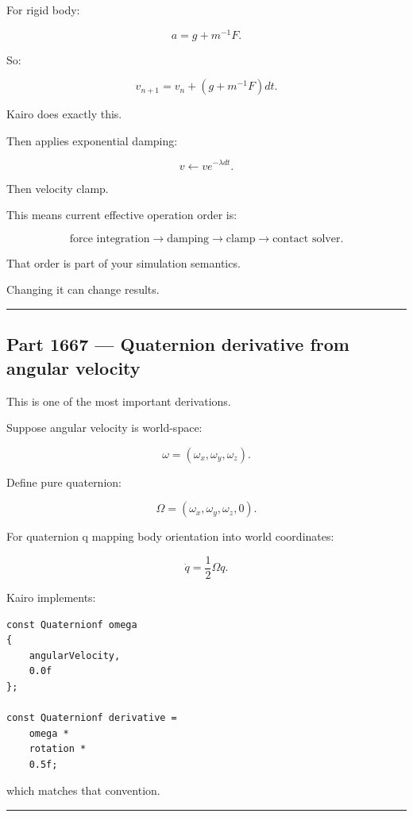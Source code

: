 For rigid body:

\[
a
=
g
+
m^{-1}F.
\]

So:

\[
\boxed{
v_{n+1}
=
v_n+
\left(
g+m^{-1}F
\right)dt.
}
\]

Kairo does exactly this.

Then applies exponential damping:

\[
v
\leftarrow
ve^{-\lambda dt}.
\]

Then velocity clamp.

This means current effective operation order is:

\[
\text{force integration}
\rightarrow
\text{damping}
\rightarrow
\text{clamp}
\rightarrow
\text{contact solver}.
\]

That order is part of your simulation semantics.

Changing it can change results.

\begin{center}\rule{0.5\linewidth}{0.5pt}\end{center}

\subsection{Part 1667 --- Quaternion derivative from angular velocity}\label{06-engine-ii-ch037-part-1667-quaternion-derivative-from-angular-velocity}

This is one of the most important derivations.

Suppose angular velocity is world-space:

\[
\omega=
(\omega_x,\omega_y,\omega_z).
\]

Define pure quaternion:

\[
\Omega
=
(\omega_x,\omega_y,\omega_z,0).
\]

For quaternion q mapping body orientation into world coordinates:

\[
\boxed{
\dot q
=
\frac12
\Omega q.
}
\]

Kairo implements:

\begin{verbatim}
const Quaternionf omega
{
    angularVelocity,
    0.0f
};

const Quaternionf derivative =
    omega *
    rotation *
    0.5f;
\end{verbatim}

which matches that convention.

\begin{center}\rule{0.5\linewidth}{0.5pt}\end{center}

